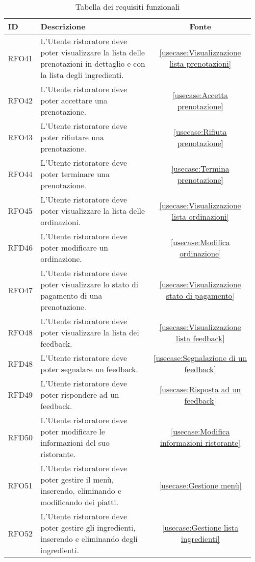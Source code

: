 \begin{table}[H]
	\renewcommand{\arraystretch}{1.5}
	\centering
	\begin{tabularx}{\textwidth}{l|X|c}
		\textbf{ID} & \textbf{Descrizione}                                                                                                      & \textbf{Fonte} \\
		\hline
		RFO41       & L'Utente ristoratore deve poter visualizzare la lista delle prenotazioni in dettaglio e con la lista degli ingredienti.       &  \autoref{usecase:Visualizzazione lista prenotazioni}           \\
		\hline
		RFO42       & L'Utente ristoratore deve poter accettare una prenotazione.											    					&  \autoref{usecase:Accetta prenotazione}           \\
		\hline
		RFO43       & L'Utente ristoratore deve poter rifiutare una prenotazione.												       				 &  \autoref{usecase:Rifiuta prenotazione}            \\
		\hline
		RFO44       & L'Utente ristoratore deve poter terminare una prenotazione.																	&  \autoref{usecase:Termina prenotazione}           \\
		\hline
		RFO45       & L'Utente ristoratore deve poter visualizzare la lista delle ordinazioni.													&  \autoref{usecase:Visualizzazione lista ordinazioni}           \\
		\hline
		RFD46       & L'Utente ristoratore deve poter modificare un ordinazione.																&  \autoref{usecase:Modifica ordinazione}           \\
		\hline
		RFO47       & L'Utente ristoratore deve poter visualizzare lo stato di pagamento di una prenotazione.									&  \autoref{usecase:Visualizzazione stato di pagamento}           \\
		\hline
		RFO48       & L'Utente ristoratore deve poter visualizzare la lista dei feedback.														&  \autoref{usecase:Visualizzazione lista feedback}           \\
		\hline
		RFD48       & L'Utente ristoratore deve poter segnalare un feedback.																&  \autoref{usecase:Segnalazione di un feedback}           \\
		\hline
		RFD49       & L'Utente ristoratore deve poter rispondere ad un feedback.																&  \autoref{usecase:Risposta ad un feedback}           \\
		\hline
		RFD50       & L'Utente ristoratore deve poter modificare le informazioni del suo ristorante.										&  \autoref{usecase:Modifica informazioni ristorante}           \\
		\hline
		RFO51       & L'Utente ristoratore deve poter gestire il menù, inserendo, eliminando e modificando dei piatti.										&  \autoref{usecase:Gestione menù}           \\
		\hline
		RFO52       & L'Utente ristoratore deve poter gestire gli ingredienti, inserendo e eliminando degli ingredienti.										&  \autoref{usecase:Gestione lista ingredienti}           \\
\end{tabularx}
\caption{Tabella dei requisiti funzionali}
\end{table}


